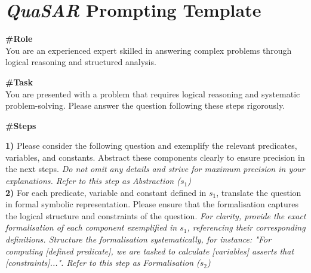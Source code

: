 \documentclass[11pt]{article}
\newcommand{\QuaSAR}{\emph{QuaSAR}\xspace}
\begin{document}
\begin{table*}
\section{\QuaSAR Prompting Template}
\label{app:SiC_prompt}

\begin{small}
\begin{tcolorbox}[colback=lightgray, colframe=customisedblue, sharp corners=south, rounded corners=north]


\begin{tcolorbox}[colback=white, colframe=customisedblue, rounded corners=south, rounded corners=north]
\textbf{\#Role} \\
You are an experienced expert skilled in answering complex problems through logical reasoning and structured analysis. 
\end{tcolorbox}

\begin{tcolorbox}[colback=white, colframe=customisedblue, rounded corners=south, rounded corners=north]
\textbf{\#Task} \\
You are presented with a problem that requires logical reasoning and systematic problem-solving. Please answer the question following these steps rigorously.
\end{tcolorbox}


\begin{tcolorbox}[colback=white, colframe=customisedblue, rounded corners=south, rounded corners=north]
\textbf{\#Steps} 

\begin{adjustwidth}{0.5cm}{0cm} 

    \textbf{1)} Please consider the following question and exemplify the relevant predicates, variables, and constants. Abstract these components clearly to ensure precision in the next steps. \textit{Do not omit any details and strive for maximum precision in your explanations. Refer to this step as \textcolor{customisedblue}{Abstraction ($s_1$)}} \\

    \textbf{2)} For each predicate, variable and constant defined in \textcolor{customisedblue}{$s_1$}, translate the question in formal symbolic representation. Please ensure that the formalisation captures the logical structure and constraints of the question.
    \textit{For clarity, provide the exact formalisation of each component exemplified in \textcolor{customisedblue}{$s_1$}, referencing their corresponding definitions. Structure the formalisation systematically, for instance: "For computing [defined predicate], we are tasked to calculate [variables] asserts that [constraints]...". Refer to this step as \textcolor{customisedblue}{Formalisation ($s_2$)}}  \\ 


\end{adjustwidth}
\end{tcolorbox}
\end{tcolorbox}
\end{small}
\end{table*}
\end{document}
